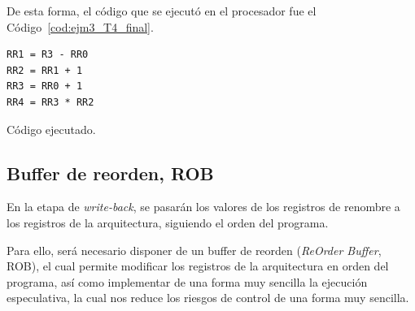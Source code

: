 \begin{ejemplo}
    De esta forma, el código que se ejecutó en el procesador fue el Código~\ref{cod:ejm3_T4_final}.
    \begin{listing}[H]
    \begin{verbatim}
RR1 = R3 - RR0
RR2 = RR1 + 1
RR3 = RR0 + 1
RR4 = RR3 * RR2
    \end{verbatim}
    \caption{Código ejecutado.}
    \label{cod:ejm3_T4_final}
    \end{listing}
\end{ejemplo}

\subsection{Buffer de reorden, ROB}
En la etapa de \emph{write-back}, se pasarán los valores de los registros de renombre a los registros de la arquitectura, siguiendo el orden del programa.

Para ello, será necesario disponer de un buffer de reorden (\emph{ReOrder Buffer}, ROB), el cual permite modificar los registros de la arquitectura en orden del programa, así como implementar de una forma muy sencilla la ejecución especulativa, la cual nos reduce los riesgos de control de una forma muy sencilla.

